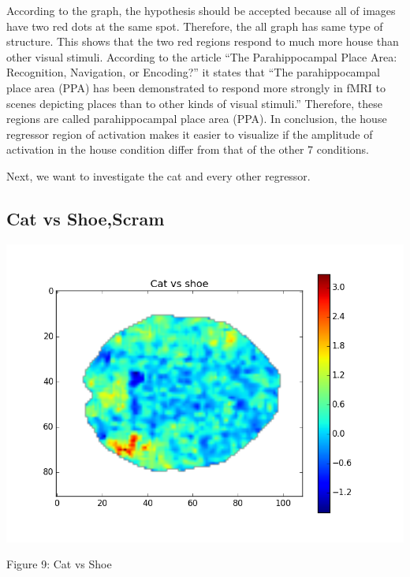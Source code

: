 \documentclass[12pt]{article}
\begin{document}
\begin{housevseverything}
\begin{housevseverything}
According to the graph, the hypothesis should be accepted because all of images have two red dots at the same spot. Therefore, the all graph has same type of structure. This shows that the two red regions respond to much more house than other visual stimuli. According to the article “The Parahippocampal Place Area: Recognition, Navigation, or Encoding?” \cite{epstein1999ppa} it states that “The parahippocampal place area (PPA) has been demonstrated to respond more strongly in fMRI to scenes depicting places than to other kinds of visual stimuli.” Therefore, these regions are called parahippocampal place area (PPA). In conclusion, the house regressor region of activation makes it easier to visualize if the amplitude of activation in the house condition differ from that of the other 7 conditions. 

\end{housevseverything}


Next, we want to investigate the cat and every other regressor. 

\subsection{Cat vs Shoe,Scram}

\begin{housevseverything}
    \centering
      \includegraphics{cat_vs_shoe}
    \caption{Figure 9: Cat vs Shoe}
    


\end{housevseverything}
\end{housevseverything}
\end{document}
